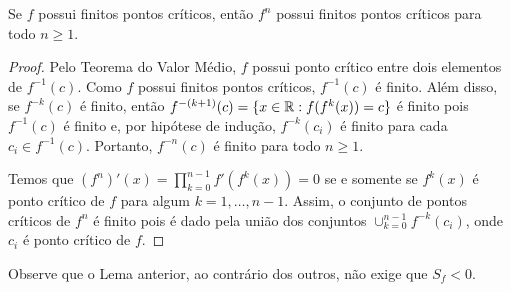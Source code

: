 \begin{lemma}
Se $f$ possui finitos pontos críticos, então $f^n$ possui finitos pontos críticos para todo $n \geq 1$.
\end{lemma}
\begin{proof}

Pelo Teorema do Valor Médio, $f$ possui ponto crítico entre dois elementos de $f^{-1}(c)$. Como $f$ possui finitos pontos críticos, $f^{-1}(c)$ é finito. Além disso, se $f^{-k}(c)$ é finito, então $f^{-(k+1)}(c) = \{ x \in \mathbb{R} : f(f^k(x)) = c \}$ é finito pois $f^{-1}(c)$ é finito e, por hipótese de indução, $f^{-k}(c_ i)$ é finito para cada $c_i \in f^{-1}(c)$. Portanto, $f^{-n}(c)$ é finito para todo $n \geq 1$.

Temos que $(f^n)'(x) = \prod_{k=0}^{n-1} f'(f^k(x)) = 0$ se e somente se $f^k(x)$ é ponto crítico de $f$ para algum $k = 1, \dots, n-1$. Assim, o conjunto de pontos críticos de $f^n$ é finito pois é dado pela união dos conjuntos $\cup_{k=0}^{n-1} f^{-k}(c_i)$, onde $c_i$ é ponto crítico de $f$.
\end{proof}

Observe que o Lema anterior, ao contrário dos outros, não exige que $S_f < 0$.
%
%

%
%
%
%

